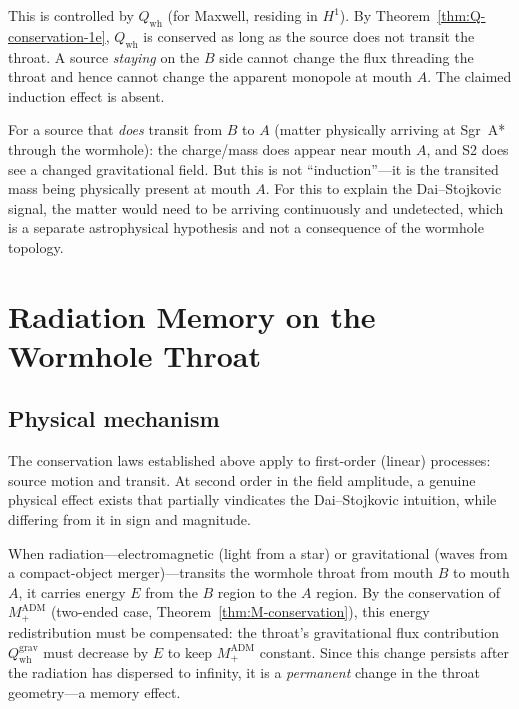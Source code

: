 \documentclass[aps,prd,onecolumn,nofootinbib,superscriptaddress]{revtex4-2}
\begin{document}
This is controlled by $Q_{\mathrm{wh}}$ (for Maxwell, residing in $H^1$).
By Theorem~\ref{thm:Q-conservation-1e}, $Q_{\mathrm{wh}}$ is conserved as long
as the source does not transit the throat.  A source \emph{staying} on the $B$
side cannot change the flux threading the throat and hence cannot change the
apparent monopole at mouth $A$.  The claimed induction effect is absent.

For a source that \emph{does} transit from $B$ to $A$ (matter physically
arriving at Sgr~A* through the wormhole): the charge/mass does appear near
mouth $A$, and S2 does see a changed gravitational field.  But this is not
``induction''---it is the transited mass being physically present at mouth $A$.
For this to explain the Dai--Stojkovic signal, the matter would need to be
arriving continuously and undetected, which is a separate astrophysical
hypothesis and not a consequence of the wormhole topology.

\section{Radiation Memory on the Wormhole Throat}
\label{sec:memory}

\subsection{Physical mechanism}

The conservation laws established above apply to first-order (linear) processes:
source motion and transit.  At second order in the field amplitude, a genuine
physical effect exists that partially vindicates the Dai--Stojkovic intuition,
while differing from it in sign and magnitude.

When radiation---electromagnetic (light from a star) or gravitational (waves
from a compact-object merger)---transits the wormhole throat from mouth $B$ to
mouth $A$, it carries energy $E$ from the $B$ region to the $A$ region.
By the conservation of $M_+^{\mathrm{ADM}}$ (two-ended case, Theorem~\ref{thm:M-conservation}),
this energy redistribution must be compensated: the throat's gravitational flux
contribution $Q_{\mathrm{wh}}^{\mathrm{grav}}$ must decrease by $E$ to keep
$M_+^{\mathrm{ADM}}$ constant.  Since this change persists after the radiation
has dispersed to infinity, it is a \emph{permanent} change in the throat
geometry---a memory effect.
\end{document}
